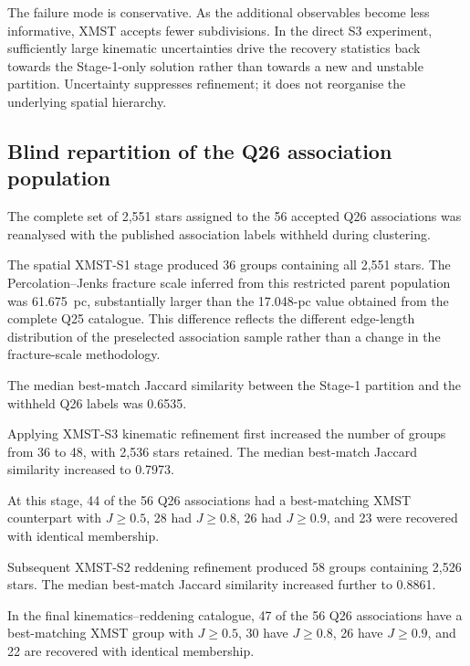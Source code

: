 \documentclass[fleqn,usenatbib]{rasti}
\begin{document}
The failure mode is conservative. As the additional observables become less informative, XMST accepts fewer subdivisions. In the direct S3 experiment, sufficiently large kinematic uncertainties drive the recovery statistics back towards the Stage-1-only solution rather than towards a new and unstable partition. Uncertainty suppresses refinement; it does not reorganise the underlying spatial hierarchy.



\subsection{Blind repartition of the Q26 association population}
\label{sec:q26_results}

The complete set of 2,551 stars assigned to the 56 accepted Q26
associations was reanalysed with the published association labels withheld
during clustering.

The spatial XMST-S1 stage produced 36 groups containing all 2,551 stars.
The Percolation--Jenks fracture scale inferred from this restricted parent
population was 61.675~pc, substantially larger than the 17.048-pc value
obtained from the complete Q25 catalogue. This difference reflects the
different edge-length distribution of the preselected association sample
rather than a change in the fracture-scale methodology.

The median best-match Jaccard similarity between the Stage-1 partition and
the withheld Q26 labels was 0.6535.

Applying XMST-S3 kinematic refinement first increased the number of groups
from 36 to 48, with 2,536 stars retained. The median best-match Jaccard
similarity increased to 0.7973.

At this stage, 44 of the 56 Q26 associations had a best-matching XMST
counterpart with $J\geq0.5$, 28 had $J\geq0.8$, 26 had $J\geq0.9$,
and 23 were recovered with identical membership.

Subsequent XMST-S2 reddening refinement produced 58 groups containing
2,526 stars. The median best-match Jaccard similarity increased further
to 0.8861.

In the final kinematics--reddening catalogue, 47 of the 56 Q26 associations
have a best-matching XMST group with $J\geq0.5$, 30 have $J\geq0.8$,
26 have $J\geq0.9$, and 22 are recovered with identical membership.
\end{document}
